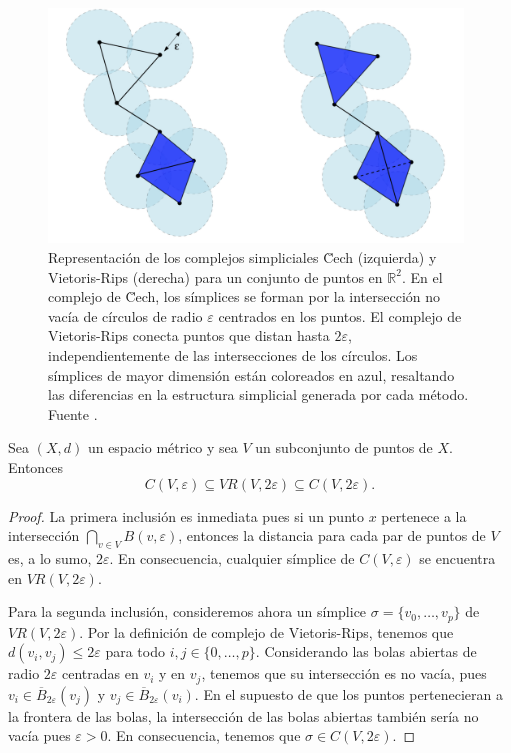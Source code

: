 \begin{figure}
	\centering
	\includegraphics[width=110mm]{img/cech-vr.png}
	\caption{Representación de los complejos simpliciales \u Cech (izquierda) y Vietoris-Rips (derecha) para un conjunto de puntos en \( \mathbb{R}^2 \). En el complejo de \u Cech, los símplices se forman por la intersección no vacía de círculos de radio \(\varepsilon\) centrados en los puntos. El complejo de Vietoris-Rips conecta puntos que distan hasta \(2\varepsilon\), independientemente de las intersecciones de los círculos. Los símplices de mayor dimensión están coloreados en azul, resaltando las diferencias en la estructura simplicial generada por cada método. Fuente \cite{chazal2021introduction}.}
\end{figure}

\begin{proposicion}
	Sea \((X,d)\) un espacio métrico y sea \(V\) un subconjunto de puntos de \(X\). Entonces
	\[
		C(V, \varepsilon) \subseteq VR(V, 2\varepsilon) \subseteq C(V, 2\varepsilon).
	\]
\end{proposicion}
\begin{proof}
	La primera inclusión es inmediata pues si un punto \(x\) pertenece a la intersección \(\bigcap_{v \in V} B(v, \varepsilon)\), entonces la distancia para cada par de puntos de \(V\) es, a lo sumo, \(2 \varepsilon\). En consecuencia, cualquier símplice de \(C(V,\varepsilon)\) se encuentra en \(VR(V, 2\varepsilon)\).
	
	Para la segunda inclusión, consideremos ahora un símplice \(\sigma = \{v_0, \dots, v_p\}\) de \(VR(V, 2\varepsilon)\). Por la definición de complejo de Vietoris-Rips, tenemos que \(d(v_i, v_j) \leq 2\varepsilon\) para todo \(i,j \in \{0, \dots, p\}\). Considerando las bolas abiertas de radio \(2\varepsilon\) centradas en \(v_i\) y en \(v_j\), tenemos que su intersección es no vacía, pues \(v_i \in \overline{B}_{2\varepsilon}(v_j)\) y \(v_j \in \overline{B}_{2\varepsilon}(v_i)\). En el supuesto de que los puntos pertenecieran a la frontera de las bolas, la intersección de las bolas abiertas también sería no vacía pues \(\varepsilon > 0\). En consecuencia, tenemos que \(\sigma \in C(V,2\varepsilon)\).
\end{proof}

